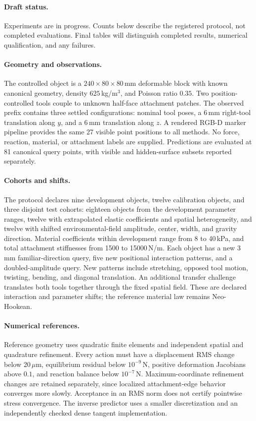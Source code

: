 \paragraph{Draft status.} Experiments are in progress. Counts below describe the registered protocol, not completed evaluations. Final tables will distinguish completed results, numerical qualification, and any failures.

\paragraph{Geometry and observations.}
The controlled object is a $240\times80\times80$\,mm deformable block with known canonical geometry, density $625$\,kg/m$^3$, and Poisson ratio $0.35$. Two position-controlled tools couple to unknown half-face attachment patches. The observed prefix contains three settled configurations: nominal tool poses, a 6\,mm right-tool translation along $y$, and a 6\,mm translation along $z$. A rendered RGB-D marker pipeline provides the same 27 visible point positions to all methods. No force, reaction, material, or attachment labels are supplied. Predictions are evaluated at 81 canonical query points, with visible and hidden-surface subsets reported separately.

\paragraph{Cohorts and shifts.}
The protocol declares nine development objects, twelve calibration objects, and three disjoint test cohorts: eighteen objects from the development parameter ranges, twelve with extrapolated elastic coefficients and spatial heterogeneity, and twelve with shifted environmental-field amplitude, center, width, and gravity direction. Material coefficients within development range from 8 to 40\,kPa, and total attachment stiffnesses from 1500 to 15000\,N/m. Each object has a new 3\,mm familiar-direction query, five new positional interaction patterns, and a doubled-amplitude query. New patterns include stretching, opposed tool motion, twisting, bending, and diagonal translation. An additional transfer challenge translates both tools together through the fixed spatial field. These are declared interaction and parameter shifts; the reference material law remains Neo-Hookean.

\paragraph{Numerical references.}
Reference geometry uses quadratic finite elements and independent spatial and quadrature refinement. Every action must have a displacement RMS change below 20\,$\mu$m, equilibrium residual below $10^{-9}$\,N, positive deformation Jacobians above $0.1$, and reaction balance below $10^{-7}$\,N. Maximum-coordinate refinement changes are retained separately, since localized attachment-edge behavior converges more slowly. Acceptance in an RMS norm does not certify pointwise stress convergence. The inverse predictor uses a smaller discretization and an independently checked dense tangent implementation.

